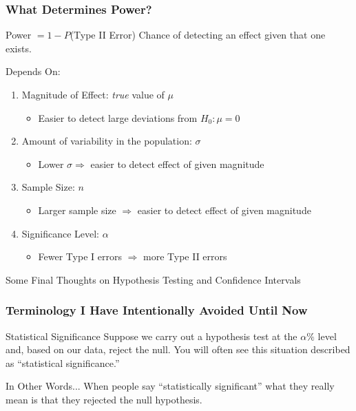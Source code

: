 \begin{frame}
\frametitle{What Determines Power?}
	\begin{block}{Power $ = 1 -  P$(Type II Error)}
Chance of detecting an effect given that one exists.
\end{block}
\begin{block}{Depends On:}
	\begin{enumerate}
\item Magnitude of Effect: \emph{true} value of $\mu$
	\begin{itemize}
		\item Easier to detect large deviations from $H_0\colon \mu = 0$
	\end{itemize}
\item Amount of variability in the population: $\sigma$
	\begin{itemize}
		\item Lower $\sigma \Rightarrow$ easier to detect effect of given magnitude
	\end{itemize}
\item Sample Size: $n$
\begin{itemize}
	\item Larger sample size $\Rightarrow$ easier to detect effect of given magnitude 
\end{itemize}
\item Significance Level: $\alpha$
\begin{itemize}
	\item Fewer Type I errors $\Rightarrow$ more Type II errors
\end{itemize}
\end{enumerate}
\end{block}

\end{frame}

\begin{frame}
\begin{center}
	\huge Some Final Thoughts on Hypothesis Testing and Confidence Intervals
\end{center}
\end{frame}
\begin{frame}
\frametitle{Terminology I Have Intentionally Avoided Until Now}

\begin{block}{Statistical Significance}
Suppose we carry out a hypothesis test at the $\alpha\%$ level and,  based on our data, reject the null. You will often see this situation described as ``statistical significance.''
\end{block}

\begin{block}{In Other Words...}
When people say ``statistically significant'' what they really mean is that they rejected the null hypothesis.
\end{block}
\end{frame}

